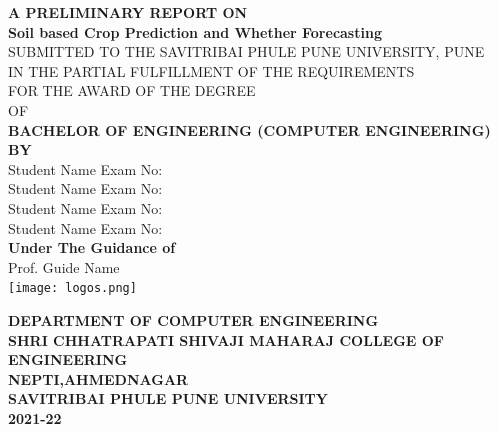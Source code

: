 \documentclass[oneside,a4paper,12pt]{report}
\begin{document}
\setlength{\parindent}{0mm}
\begin{center}

{\bfseries A PRELIMINARY REPORT ON \\}
 \vspace*{2\baselineskip}
{\bfseries \fontsize{16}{12} \selectfont  Soil based Crop Prediction 		 and Whether Forecasting \\ \vspace*{2\baselineskip}}
{\fontsize{12}{12} \selectfont SUBMITTED TO THE SAVITRIBAI PHULE PUNE UNIVERSITY, PUNE\\
IN THE PARTIAL FULFILLMENT OF THE REQUIREMENTS \\
FOR THE AWARD OF THE DEGREE \\
\vspace*{0\baselineskip}
OF
\vspace*{2\baselineskip}}\\
{\bfseries \fontsize{14}{12} \selectfont BACHELOR OF ENGINEERING (COMPUTER ENGINEERING)  \\
\vspace*{1\baselineskip}} 
{\bfseries \fontsize{14}{12} \selectfont BY \\ 
\vspace*{1\baselineskip}} 
Student Name  \hspace{25 mm} Exam No:  \\
Student Name \hspace{25 mm} Exam No:   \\
Student Name \hspace{25 mm} Exam No:  \\
Student Name \hspace{25 mm} Exam No:\\
\vspace*{1\baselineskip}
{\bfseries \fontsize{14}{12} \selectfont Under The Guidance of \\  
\vspace*{0\baselineskip}} 
Prof. Guide Name\\
\texttt{[image: logos.png]} \\
{\bfseries \fontsize{14}{12} \selectfont DEPARTMENT OF COMPUTER ENGINEERING
\\

SHRI CHHATRAPATI SHIVAJI MAHARAJ COLLEGE OF ENGINEERING
\\

NEPTI,AHMEDNAGAR
\\
SAVITRIBAI PHULE PUNE UNIVERSITY 
\\
2021-22

}
\end{center}
\end{document}
